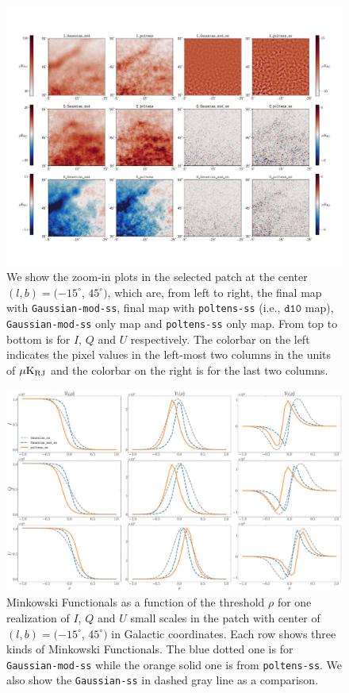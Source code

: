 \documentclass[twocolumn]{aastex631}
\begin{document}
\begin{figure}
    \centering
    \includegraphics[width=180mm]{figures/maps_patch_345_45.pdf}
    \caption{We show the zoom-in plots in the selected patch at the center $(l, b) = (-15^{\circ}$, $45^{\circ})$, which are, from left to right, the final map with \texttt{Gaussian-mod-ss}, final map with \texttt{poltens-ss} (i.e., $\texttt{d10}$ map), \texttt{Gaussian-mod-ss} only map and \texttt{poltens-ss} only map. From top to bottom is for $I$, $Q$ and $U$ respectively. The colorbar on the left indicates the pixel values in the left-most two columns in the units of $\mu \rm K_{RJ}$ and the colorbar on the right is for the last two columns. }
    \label{fig:maps:patch2}
\end{figure}

\begin{figure}
    \centering
    \includegraphics[width=180mm]{figures/MFs_345_45_with_G_rescaled.pdf}
    \caption{Minkowski Functionals as a function of the threshold $\rho$ for one realization of $I$, $Q$ and $U$ small scales in the patch with center of $(l, b) = (-15^{\circ}$, $45^{\circ})$ in Galactic coordinates. Each row shows three kinds of Minkowski Functionals. The blue dotted one is for \texttt{Gaussian-mod-ss} while the orange solid one is from \texttt{poltens-ss}. We also show the \texttt{Gaussian-ss} in dashed gray line as a comparison.}
    \label{fig:MF:patch2}
\end{figure}
\end{document}
